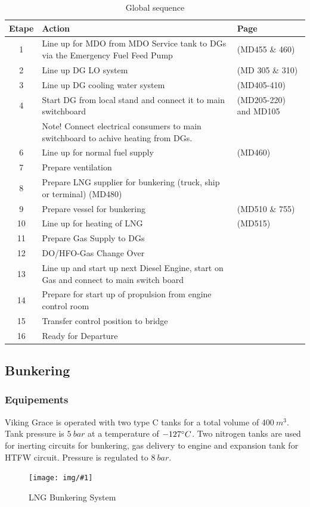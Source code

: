 \documentclass[12pt,a4paper]{article}
\newcommand{\image}[3]
 {\begin{figure}[H]
         \begin{center}
          \texttt{[image: img/\#1]}
          \caption{#2} \label{img_#1}
         \end{center}
  \end{figure}
}
\begin{document}
\begin{table}[htbp]
\scriptsize
\begin{tabular}{||c||l||l||}
\hline
Etape & Action & Page  \\ \hline
1 &  Line up for MDO from MDO Service tank to DGs via the Emergency Fuel Feed Pump & (MD455 \& 460) \\ \hline
2 &  Line up DG LO system & (MD 305 \& 310) \\ \hline
3 &  Line up DG cooling water system& (MD405-410) \\ \hline
4 &  Start DG from local stand and connect it to main switchboard & (MD205-220) and MD105 \\ 
& Note! Connect electrical consumers to main switchboard to achive heating from DGs. & \\ \hline
6 &  Line up for normal fuel supply & (MD460) \\ \hline
7 &  Prepare ventilation & \\ \hline
8 &  Prepare LNG supplier for bunkering (truck, ship or terminal) (MD480) &\\ \hline
9 &  Prepare vessel for bunkering &(MD510 \& 755) \\ \hline
10 &  Line up for heating of LNG & (MD515) \\ \hline
11 &  Prepare Gas Supply to DGs & \\ \hline
12 &  DO/HFO-Gas Change Over &\\ \hline
13 &  Line up and start up next Diesel Engine, start on Gas and connect to main switch board &\\ \hline
14 &  Prepare for start up of propulsion from engine control room &\\ \hline
15 &  Transfer control position to bridge &\\ \hline
16 & Ready for Departure &\\ \hline
\end{tabular}
\caption{Global sequence}
\label{}
\end{table}

\subsection{Bunkering}

\subsubsection{Equipements}

Viking Grace is operated with two type C tanks for a total volume of $400 ~m^3$. Tank pressure is $5~bar$ at a temperature of $-127 \degree C$. Two nitrogen tanks are used for inerting circuits for bunkering, gas delivery to engine and expansion tank for HTFW circuit. Pressure is regulated to $8~bar$.
\image{BS}{LNG Bunkering System}{0.6}
\end{document}
